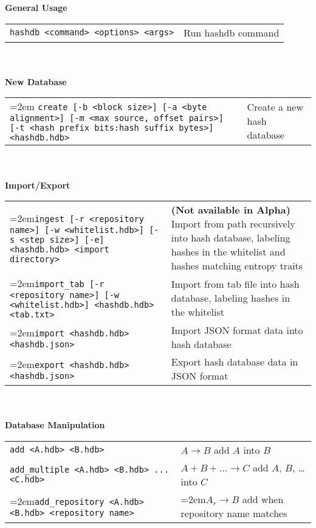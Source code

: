 \begin{footnotesize}
\textbf{General Usage} \\
\begin{tabular}{p{3.6 in} p{3.0 in}}
\texttt{hashdb <command> <options> <args>} & Run hashdb command \\
\end{tabular}
\\
\\
\textbf{New Database} \\
\begin{tabular}{p{3.6 in} p{3.0 in}}
\hangindent=2em \texttt{create [-b <block size>] [-a <byte alignment>] [-m <max source, offset pairs>] [-t <hash prefix bits:hash suffix bytes>] <hashdb.hdb>} &
Create a new hash database \\
\end{tabular}
\\
\\
\textbf{Import/Export} \\
\begin{tabular}{p{3.6 in} p{3.0 in}}
\hangindent=2em\texttt{ingest [-r <repository name>] [-w <whitelist.hdb>] [-s <step size>] [-e] <hashdb.hdb> <import directory>} &
\textbf{(Not available in Alpha)} Import from path recursively into hash database, labeling hashes in the whitelist and hashes matching entropy traits \\
\hangindent=2em\texttt{import\_tab [-r <repository name>] [-w <whitelist.hdb>] <hashdb.hdb> <tab.txt>} &
Import from tab file into hash database, labeling hashes in the whitelist\\
\hangindent=2em\texttt{import <hashdb.hdb> <hashdb.json>} &
Import JSON format data into hash database \\
\hangindent=2em\texttt{export <hashdb.hdb> <hashdb.json>} &
Export hash database data in JSON format \\
\end{tabular}
\\
\\
\textbf{Database Manipulation} \\
\begin{tabular}{p{3.6 in} p{3.0 in}}
\texttt{add <A.hdb> <B.hdb>} & $A \rightarrow B$ add $A$ into $B$ \\
\texttt{add\_multiple <A.hdb> <B.hdb> ... <C.hdb>} & $A + B + \ldots \rightarrow C$ add $A$, $B$, \ldots into $C$\\
\hangindent=2em\texttt{add\_repository <A.hdb> <B.hdb> <repository name>} & \hangindent=2em$A_r \rightarrow B$ add when repository name matches \\

\end{tabular}
\end{footnotesize}
